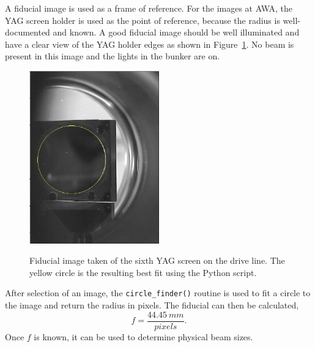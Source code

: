 A fiducial image is used as a frame of reference. 
For the images at AWA, the YAG screen holder is used 
as the point of reference, because the radius is well-documented and known.
A good fiducial image should be well illuminated and have a clear view of the YAG holder 
edges as shown in Figure~\ref{fig:fiducial}.  
No beam is present in this image and the lights in the bunker are on.
\begin{figure}
	\centering
	\includegraphics[width=0.5\textwidth]{images/YAG6_kicker_fiducial}
	\label{fig:fiducial}
	\caption{Fiducial image taken of the sixth YAG screen on the drive line.
	The yellow circle is the resulting best fit using the Python script. }
\end{figure}
After selection of an image, the \verb|circle_finder()| routine is used 
to fit a circle to the image and return the radius in pixels.
The fiducial can then be calculated,
\begin{equation}
	f = \frac{\SI{44.45}{mm}}{pixels}. 
\end{equation}
Once $f$ is known, it can be used to determine physical beam sizes.


